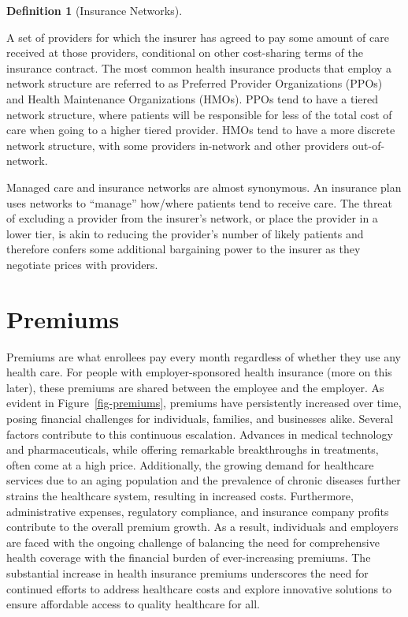 \documentclass[
  letterpaper,
  DIV=11,
  numbers=noendperiod]{scrreport}
\theoremstyle{definition}
\newtheorem{definition}{Definition}[chapter]
\theoremstyle{remark}
\begin{document}
\begin{definition}[Insurance
Networks]\protect\hypertarget{def-insurancenetwork}{}\label{def-insurancenetwork}

A set of providers for which the insurer has agreed to pay some amount
of care received at those providers, conditional on other cost-sharing
terms of the insurance contract. The most common health insurance
products that employ a network structure are referred to as Preferred
Provider Organizations (PPOs) and Health Maintenance Organizations
(HMOs). PPOs tend to have a tiered network structure, where patients
will be responsible for less of the total cost of care when going to a
higher tiered provider. HMOs tend to have a more discrete network
structure, with some providers in-network and other providers
out-of-network.

\end{definition}

Managed care and insurance networks are almost synonymous. An insurance
plan uses networks to ``manage'' how/where patients tend to receive
care. The threat of excluding a provider from the insurer's network, or
place the provider in a lower tier, is akin to reducing the provider's
number of likely patients and therefore confers some additional
bargaining power to the insurer as they negotiate prices with providers.

\hypertarget{premiums}{%
\section{Premiums}\label{premiums}}

Premiums are what enrollees pay every month regardless of whether they
use any health care. For people with employer-sponsored health insurance
(more on this later), these premiums are shared between the employee and
the employer. As evident in Figure~\ref{fig-premiums}, premiums have
persistently increased over time, posing financial challenges for
individuals, families, and businesses alike. Several factors contribute
to this continuous escalation. Advances in medical technology and
pharmaceuticals, while offering remarkable breakthroughs in treatments,
often come at a high price. Additionally, the growing demand for
healthcare services due to an aging population and the prevalence of
chronic diseases further strains the healthcare system, resulting in
increased costs. Furthermore, administrative expenses, regulatory
compliance, and insurance company profits contribute to the overall
premium growth. As a result, individuals and employers are faced with
the ongoing challenge of balancing the need for comprehensive health
coverage with the financial burden of ever-increasing premiums. The
substantial increase in health insurance premiums underscores the need
for continued efforts to address healthcare costs and explore innovative
solutions to ensure affordable access to quality healthcare for all.
\end{document}
